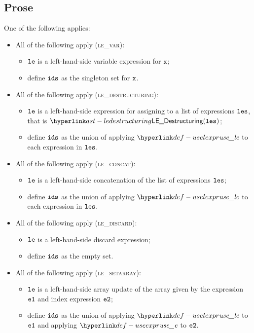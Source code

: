\subsection{Prose}
One of the following applies:
\begin{itemize}
  \item All of the following apply (\textsc{le\_var}):
  \begin{itemize}
    \item $\texttt{le}$ is a left-hand-side variable expression for $\texttt{x}$;
    \item define $\texttt{ids}$ as the singleton set for $\texttt{x}$.
  \end{itemize}

  \item All of the following apply (\textsc{le\_destructuring}):
  \begin{itemize}
    \item $\texttt{le}$ is a left-hand-side expression for assigning to a list of expressions $\texttt{les}$,
          that is $\LEDestructuring(\vles)$;
    \item define $\texttt{ids}$ as the union of applying $\uselexpr$ to each expression in $\texttt{les}$.
  \end{itemize}

  \item All of the following apply (\textsc{le\_concat}):
  \begin{itemize}
    \item $\texttt{le}$ is a left-hand-side concatenation of the list of expressions $\texttt{les}$;
    \item define $\texttt{ids}$ as the union of applying $\uselexpr$ to each expression in $\texttt{les}$.
  \end{itemize}

  \item All of the following apply (\textsc{le\_discard}):
  \begin{itemize}
    \item $\texttt{le}$ is a left-hand-side discard expression;
    \item define $\texttt{ids}$ as the empty set.
  \end{itemize}

  \item All of the following apply (\textsc{le\_setarray}):
  \begin{itemize}
    \item $\texttt{le}$ is a left-hand-side array update of the array given by the expression $\texttt{e1}$ and index expression $\texttt{e2}$;
    \item define $\texttt{ids}$ as the union of applying $\uselexpr$ to $\texttt{e1}$ and applying $\useexpr$ to $\texttt{e2}$.
  \end{itemize}


\end{itemize}
